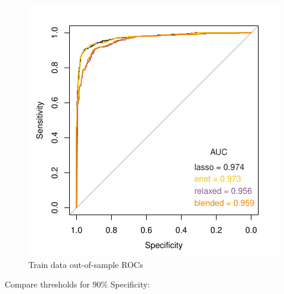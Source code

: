 \documentclass[
]{book}
\begin{document}
\begin{figure}
\centering
\includegraphics{Static/figures/trainROC-1.pdf}
\caption{\label{fig:trainROC}Train data out-of-sample ROCs}
\end{figure}

Compare thresholds for 90\% Specificity:
\end{document}
